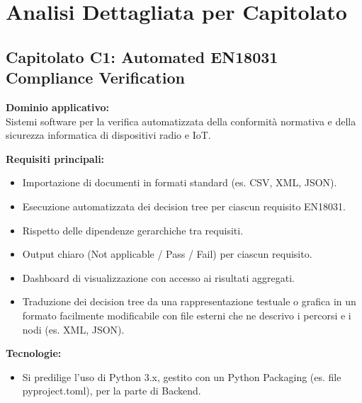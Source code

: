 \section{Analisi Dettagliata per Capitolato}

\subsection{Capitolato C1: {Automated EN18031 Compliance Verification} }

\textbf{Dominio applicativo:} \\
{Sistemi software per la verifica automatizzata della conformità normativa e della sicurezza informatica di dispositivi radio e IoT.}

\vspace{0.3cm}
\textbf{Requisiti principali:}
\begin{itemize}
	\item {Importazione di documenti in formati standard (es. CSV, XML, JSON).}
	\item {Esecuzione automatizzata dei decision tree per ciascun requisito EN18031.}
    \item Rispetto delle dipendenze gerarchiche tra requisiti.
    \item Output chiaro (Not applicable / Pass / Fail) per ciascun requisito.
    \item Dashboard di visualizzazione con accesso ai risultati aggregati.
    \item Traduzione dei decision tree da una rappresentazione testuale o grafica in
un formato facilmente modificabile con file esterni che ne descrivo i
percorsi e i nodi (es. XML, JSON).
\end{itemize}

\vspace{0.3cm}
\textbf{Tecnologie:}
\begin{itemize}
	\item {Si predilige l’uso di Python 3.x, gestito con un
Python Packaging (es. file pyproject.toml), per la parte di Backend.}
\end{itemize}

